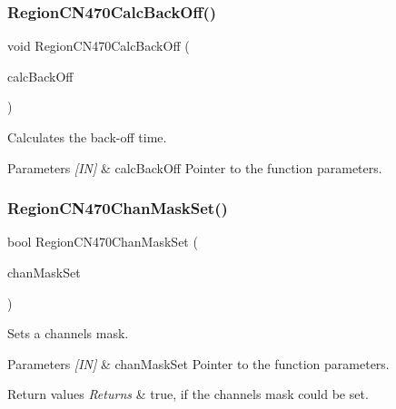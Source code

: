 \subsubsection{\texorpdfstring{Region\+C\+N470\+Calc\+Back\+Off()}{RegionCN470CalcBackOff()}}
{\footnotesize\ttfamily void Region\+C\+N470\+Calc\+Back\+Off (\begin{DoxyParamCaption}\item[{\hyperlink{group__REGION_ga7c5c9a8da174e6679eded8257dc92fd9}{Calc\+Back\+Off\+Params\+\_\+t} $\ast$}]{calc\+Back\+Off }\end{DoxyParamCaption})}



Calculates the back-\/off time. 


\begin{DoxyParams}{Parameters}
{\em \mbox{[}\+I\+N\mbox{]}} & calc\+Back\+Off Pointer to the function parameters. \\
\hline
\end{DoxyParams}
\mbox{\label{group__REGIONCN470_ga361aa9a80854b1a264a9ad0720cbd4da}} 
\subsubsection{\texorpdfstring{Region\+C\+N470\+Chan\+Mask\+Set()}{RegionCN470ChanMaskSet()}}
{\footnotesize\ttfamily bool Region\+C\+N470\+Chan\+Mask\+Set (\begin{DoxyParamCaption}\item[{\hyperlink{group__REGION_ga6d24f7da136006410827dfb29f6b9b9e}{Chan\+Mask\+Set\+Params\+\_\+t} $\ast$}]{chan\+Mask\+Set }\end{DoxyParamCaption})}



Sets a channels mask. 


\begin{DoxyParams}{Parameters}
{\em \mbox{[}\+I\+N\mbox{]}} & chan\+Mask\+Set Pointer to the function parameters.\\
\hline
\end{DoxyParams}

\begin{DoxyRetVals}{Return values}
{\em Returns} & true, if the channels mask could be set. \\
\hline
\end{DoxyRetVals}
\mbox{\label{group__REGIONCN470_ga6f447bc77fedcf05b61c6a4247b0972b}} 
